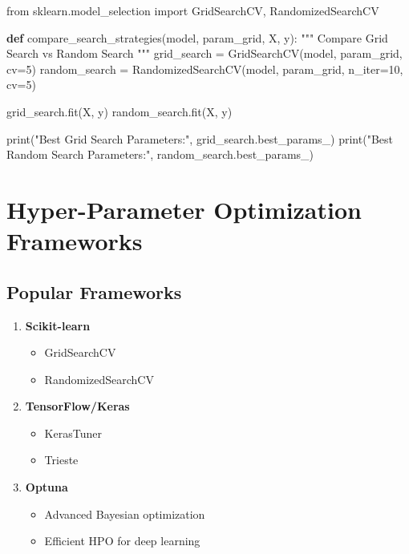\documentclass[
  letterpaper,
  DIV=11,
  numbers=noendperiod]{scrreprt}
\newenvironment{Shaded}{\begin{snugshade}}{\end{snugshade}}
\newcommand{\BuiltInTok}[1]{\textcolor[rgb]{0.00,0.23,0.31}{#1}}
\newcommand{\CommentTok}[1]{\textcolor[rgb]{0.37,0.37,0.37}{#1}}
\newcommand{\DecValTok}[1]{\textcolor[rgb]{0.68,0.00,0.00}{#1}}
\newcommand{\ImportTok}[1]{\textcolor[rgb]{0.00,0.46,0.62}{#1}}
\newcommand{\KeywordTok}[1]{\textcolor[rgb]{0.00,0.23,0.31}{\textbf{#1}}}
\newcommand{\NormalTok}[1]{\textcolor[rgb]{0.00,0.23,0.31}{#1}}
\newcommand{\OperatorTok}[1]{\textcolor[rgb]{0.37,0.37,0.37}{#1}}
\newcommand{\StringTok}[1]{\textcolor[rgb]{0.13,0.47,0.30}{#1}}
\providecommand{\tightlist}{%
  \setlength{\itemsep}{0pt}\setlength{\parskip}{0pt}}\usepackage{longtable,booktabs,array}
\begin{document}
\begin{Shaded}
\begin{Highlighting}[]
\ImportTok{from}\NormalTok{ sklearn.model\_selection }\ImportTok{import}\NormalTok{ GridSearchCV, RandomizedSearchCV}

\KeywordTok{def}\NormalTok{ compare\_search\_strategies(model, param\_grid, X, y):}
    \CommentTok{"""}
\CommentTok{    Compare Grid Search vs Random Search}
\CommentTok{    """}
\NormalTok{    grid\_search }\OperatorTok{=}\NormalTok{ GridSearchCV(model, param\_grid, cv}\OperatorTok{=}\DecValTok{5}\NormalTok{)}
\NormalTok{    random\_search }\OperatorTok{=}\NormalTok{ RandomizedSearchCV(model, param\_grid, n\_iter}\OperatorTok{=}\DecValTok{10}\NormalTok{, cv}\OperatorTok{=}\DecValTok{5}\NormalTok{)}
    
\NormalTok{    grid\_search.fit(X, y)}
\NormalTok{    random\_search.fit(X, y)}
    
    \BuiltInTok{print}\NormalTok{(}\StringTok{"Best Grid Search Parameters:"}\NormalTok{, grid\_search.best\_params\_)}
    \BuiltInTok{print}\NormalTok{(}\StringTok{"Best Random Search Parameters:"}\NormalTok{, random\_search.best\_params\_)}
\end{Highlighting}
\end{Shaded}

\section{Hyper-Parameter Optimization
Frameworks}\label{hyper-parameter-optimization-frameworks}

\subsection{Popular Frameworks}\label{popular-frameworks}

\begin{enumerate}
\def\labelenumi{\arabic{enumi}.}
\tightlist
\item
  \textbf{Scikit-learn}

  \begin{itemize}
  \tightlist
  \item
    GridSearchCV
  \item
    RandomizedSearchCV
  \end{itemize}
\item
  \textbf{TensorFlow/Keras}

  \begin{itemize}
  \tightlist
  \item
    KerasTuner
  \item
    Trieste
  \end{itemize}
\item
  \textbf{Optuna}

  \begin{itemize}
  \tightlist
  \item
    Advanced Bayesian optimization
  \item
    Efficient HPO for deep learning
  \end{itemize}
\end{enumerate}
\end{document}
